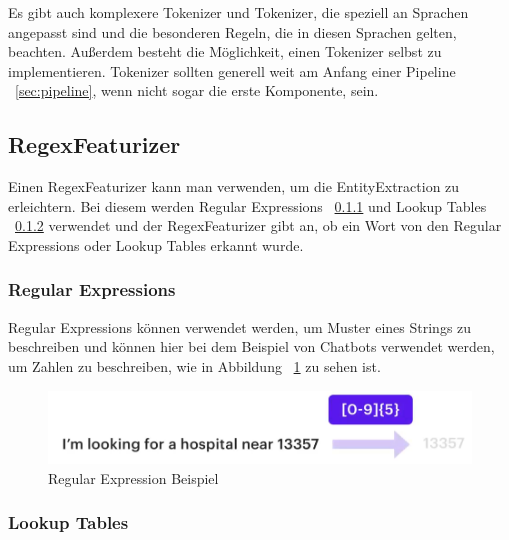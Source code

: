 Es gibt auch komplexere Tokenizer und Tokenizer, die speziell an Sprachen angepasst sind und die besonderen Regeln, die in diesen Sprachen gelten, beachten.
Außerdem besteht die Möglichkeit, einen Tokenizer selbst zu implementieren.\cite{whitespaceTokenizer, rasaMasterclassWhitespaceTokenizer, pipelineComponentsYoutube}
Tokenizer sollten generell weit am Anfang einer Pipeline ~\ref{sec:pipeline}, wenn nicht sogar die erste Komponente, sein.

\subsection{RegexFeaturizer}\label{subsec:regex-featurizer}

Einen RegexFeaturizer kann man verwenden, um die EntityExtraction zu erleichtern.
Bei diesem werden Regular Expressions ~\ref{subsubsec:regex-featurizer-regex} und Lookup Tables ~\ref{subsubsec:lookup-tables} verwendet und der RegexFeaturizer gibt an, ob ein Wort von den Regular Expressions oder Lookup Tables erkannt wurde.\cite{rasaMasterclassRegexFeaturizer, pipelineComponentsYoutube, regexFeaturizerCrf}

\subsubsection{Regular Expressions}\label{subsubsec:regex-featurizer-regex}

Regular Expressions können verwendet werden, um Muster eines Strings zu beschreiben und können hier bei dem Beispiel von Chatbots verwendet werden, um Zahlen zu beschreiben, wie in Abbildung ~\ref{fig:Regular Expression Beispiel} zu sehen ist.\cite{rasaMasterclassRegexFeaturizer, pipelineComponentsYoutube, regexFeaturizerCrf}

\begin{figure}[hbt!]
    \centering
    \includegraphics[scale=0.5]{pics/regular-expression-example}
    \caption{Regular Expression Beispiel~\cite{pipelineComponentsYoutube}}
    \label{fig:Regular Expression Beispiel}
\end{figure}

\subsubsection{Lookup Tables}\label{subsubsec:lookup-tables}

